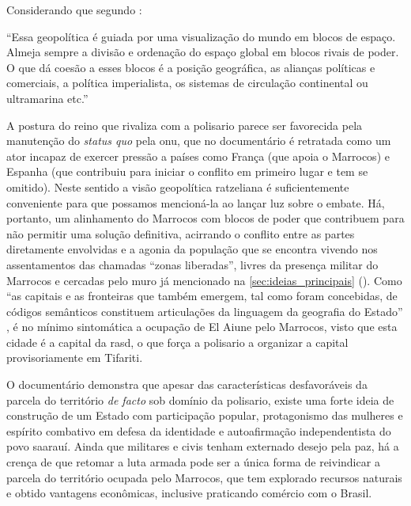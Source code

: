 	Considerando que segundo :
	
	\begin{citacao}
		``Essa geopolítica é guiada por uma visualização do mundo em blocos de espaço. Almeja sempre a divisão e ordenação do espaço global em blocos rivais de poder. O que dá coesão a esses blocos é a posição geográfica, as alianças políticas e comerciais, a política imperialista, os sistemas de circulação continental ou ultramarina etc.''
	\end{citacao}

	A postura do reino que rivaliza com a \gls{polisario} parece ser favorecida pela manutenção do \textit{status quo} pela \glsdesc{onu}, que no documentário é retratada como um ator incapaz de exercer pressão a países como França (que apoia o Marrocos) e Espanha (que contribuiu para iniciar o conflito em primeiro lugar e tem se omitido). Neste sentido a visão geopolítica ratzeliana é suficientemente conveniente para que possamos mencioná-la ao lançar luz sobre o embate. Há, portanto, um alinhamento do Marrocos com blocos de poder que contribuem para não permitir uma solução definitiva, acirrando o conflito entre as partes diretamente envolvidas e a agonia da população que se encontra vivendo nos assentamentos das chamadas ``zonas liberadas'', livres da presença militar do Marrocos e cercadas pelo muro já mencionado na \autoref{sec:ideias_principais} (). Como ``as capitais e as fronteiras que também emergem, tal como foram concebidas, de códigos semânticos constituem articulações da linguagem da geografia do Estado'' \cite[p. 25]{raffestin1993}, é no mínimo sintomática a ocupação de El Aiune pelo Marrocos, visto que esta cidade é a capital da \glsdesc{rasd}, o que força a \gls{polisario} a organizar a capital provisoriamente em Tifariti.

	O documentário demonstra que apesar das características desfavoráveis da parcela do território \textit{de facto} sob domínio da \gls{polisario}, existe uma forte ideia de construção de um Estado com participação popular, protagonismo das mulheres e espírito combativo em defesa da identidade e autoafirmação independentista do povo saarauí. Ainda que militares e civis tenham externado desejo pela paz, há a crença de que retomar a luta armada pode ser a única forma de reivindicar a parcela do território ocupada pelo Marrocos, que tem explorado recursos naturais e obtido vantagens econômicas, inclusive praticando comércio com o Brasil.
	

